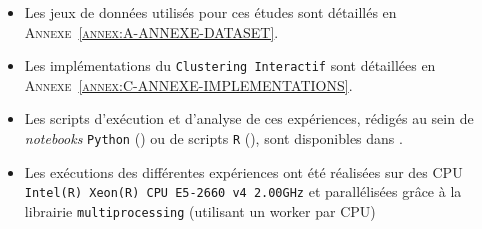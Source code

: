 	\setcounter{localCounterOfFootnoteValue}{\value{footnote}}
	\begin{leftBarInformation}
		\begin{itemize}
			\item Les jeux de données utilisés pour ces études sont détaillés en \textsc{Annexe~\ref{annex:A-ANNEXE-DATASET}}.
			\item Les implémentations du \texttt{Clustering Interactif} sont détaillées en \textsc{Annexe~\ref{annex:C-ANNEXE-IMPLEMENTATIONS}}.
			\item Les scripts d'exécution et d'analyse de ces expériences, rédigés au sein de \textit{notebooks} \texttt{Python} (\cite{van-rossum-drake:2009:python-reference-manual}) ou de scripts \texttt{R} (\cite{r-core-team:2017:language-environment-statistical}), sont disponibles dans \cite{schild:2021:cognitivefactory-interactiveclusteringcomparativestudy}.
			\item Les exécutions des différentes expériences ont été réalisées sur des CPU \texttt{Intel(R) Xeon(R) CPU E5-2660 v4 \@ 2.00GHz} et parallélisées grâce à la librairie \texttt{multiprocessing} \footnotemark (utilisant un worker par CPU)
		\end{itemize}
	\end{leftBarInformation}
	
	
	\minitoc
	
	\newpage
	
	
	
	\newpage
	
	
	
	\newpage
	
	
	
	\newpage
	
	
